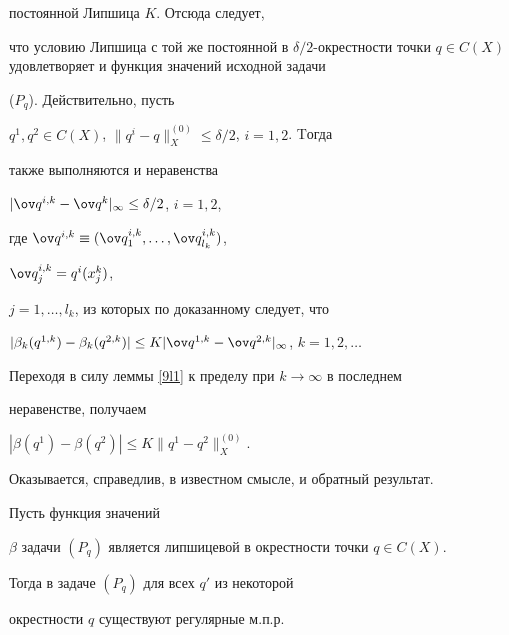 постоянной Липшица $K$. Отсюда следует,


что условию Липшица с той же постоянной в $\delta/2$-окрестности точки $q\in


C(X)$ удовлетворяет и функция значений исходной задачи


($P_q$). Действительно, пусть


$q^1,q^2\in C(X)$, $\|q^i-q\|_X^{(0)}\leq\delta/2$, $i=1,2$. Tогда


также выполняются и неравенства


$|\ov q^{i,k}-\ov q^k|_\infty\leq\delta/2$, $i=1,2$,


где $\ov q^{i,k}\equiv(\ov q^{i,k}_1,\dotsc,\ov q^{i,k}_{l_k})$,


$\ov q^{i,k}_j=q^i(x^k_j)$,


$j=1,\dotsc,l_k$, из которых по доказанному следует, что


$|\beta_k(q^{1,k})-\beta_k(q^{2,k})|\leq


K|\ov q^{1,k}-\ov q^{2,k}|_\infty$, $k=1,2,\dotsc$


Переходя в силу леммы \ref{9l1} к пределу при $k\to\infty$ в последнем


неравенстве, получаем


$|\beta(q^1)-\beta(q^2)|\leq K\|q^1-q^2\|_X^{(0)}$.





Оказывается, справедлив, в известном смысле, и обратный результат.





\begin{thms}\label{9t5}


Пусть функция значений


$\beta$ задачи $(P_q)$ является липшицевой в окрестности точки $q\in C(X)$.


Тогда в задаче $(P_q)$ для всех $q'$ из некоторой


окрестности $q$ существуют регулярные м.п.р.


\end{thms}






